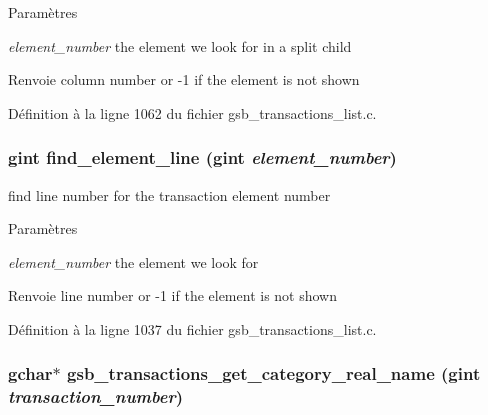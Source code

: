 \begin{DoxyParams}{Paramètres}
\item[{\em element\_\-number}]the element we look for in a split child\end{DoxyParams}
\begin{DoxyReturn}{Renvoie}
column number or -\/1 if the element is not shown 
\end{DoxyReturn}


Définition à la ligne 1062 du fichier gsb\_\-transactions\_\-list.c.

\subsubsection[{find\_\-element\_\-line}]{\setlength{\rightskip}{0pt plus 5cm}gint find\_\-element\_\-line (gint {\em element\_\-number})}\label{gsb__transactions__list_8h_a17bf5dcbc82415220a20244112d65aef}
find line number for the transaction element number


\begin{DoxyParams}{Paramètres}
\item[{\em element\_\-number}]the element we look for\end{DoxyParams}
\begin{DoxyReturn}{Renvoie}
line number or -\/1 if the element is not shown 
\end{DoxyReturn}


Définition à la ligne 1037 du fichier gsb\_\-transactions\_\-list.c.

\subsubsection[{gsb\_\-transactions\_\-get\_\-category\_\-real\_\-name}]{\setlength{\rightskip}{0pt plus 5cm}gchar$\ast$ gsb\_\-transactions\_\-get\_\-category\_\-real\_\-name (gint {\em transaction\_\-number})}\label{gsb__transactions__list_8h_a1144ff7dd8c9bf6a2a6eb870fc8ae2df}


